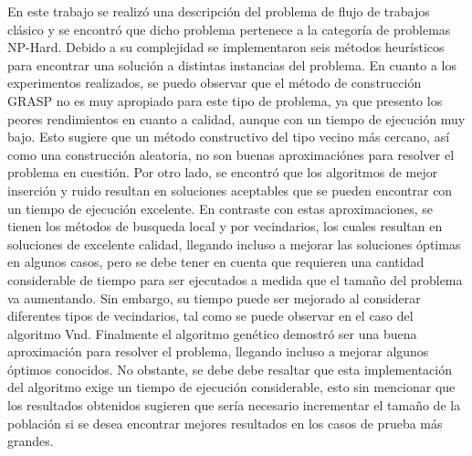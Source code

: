 \documentclass[10pt, twoside]{article}
\begin{document}
En este trabajo se realizó una descripción del problema de flujo de trabajos
clásico y se encontró que dicho problema pertenece a la categoría de problemas
NP-Hard. Debido a su complejidad se implementaron seis métodos heurísticos
para encontrar una solución a distintas instancias del problema. En cuanto a
los experimentos realizados, se puedo observar que el método de construcción
GRASP no es muy apropiado para este tipo de problema, ya que presento los
peores rendimientos en cuanto a calidad, aunque con un tiempo de ejecución muy
bajo.  Esto sugiere que un método constructivo del tipo vecino más cercano, así
como una construcción aleatoria, no son buenas aproximaciónes para resolver el
problema en cuestión.  Por otro lado, se encontró que los algoritmos de mejor
inserción y ruido resultan en soluciones aceptables que se pueden encontrar con
un tiempo de ejecución excelente. En contraste con estas aproximaciones, se
tienen los métodos de busqueda local y por vecindarios, los cuales resultan en
soluciones de excelente calidad, llegando incluso a mejorar las soluciones óptimas
en algunos casos, pero se debe tener en cuenta que requieren una cantidad
considerable de tiempo para ser ejecutados a medida que el tamaño del problema
va aumentando. Sin embargo, su tiempo puede ser mejorado al considerar diferentes
tipos de vecindarios, tal como se puede observar en el caso del algoritmo Vnd.
Finalmente el algoritmo genético demostró ser una buena aproximación para
resolver el problema, llegando incluso a mejorar algunos óptimos conocidos. 
No obstante, se debe debe resaltar que esta implementación del algoritmo exige un
tiempo de ejecución considerable, esto sin mencionar que los resultados
obtenidos sugieren que sería necesario incrementar el tamaño de la población si
se desea encontrar mejores resultados en los casos de prueba más grandes.

{\small


}
\end{document}
